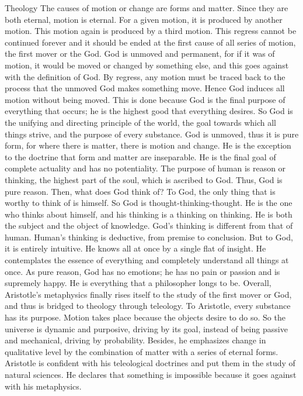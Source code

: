 \documentclass[11pt]{article}
\begin{document}
Theology
  The causes of motion or change are forms and matter. Since they are both eternal, motion is eternal. For a given motion, it is produced by another motion. This motion again is produced by a third motion. This regress cannot be continued forever and it should be ended at the first cause of all series of motion, the first mover or the God. God is unmoved and permanent, for if it was of motion, it would be moved or changed by something else, and this goes against with the definition of God. By regress, any motion must be traced back to the process that the unmoved God makes something move. Hence God induces all motion without being moved. This is done because God is the final purpose of everything that occurs; he is the highest good that everything desires. So God is the unifying and directing principle of the world, the goal towards which all things strive, and the purpose of every substance.
  God is unmoved, thus it is pure form, for where there is matter, there is motion and change. He is the exception to the doctrine that form and matter are inseparable. He is the final goal of complete actuality and has no potentiality.
  The purpose of human is reason or thinking, the highest part of the soul, which is ascribed to God. Thus, God is pure reason. Then, what does God think of? To God, the only thing that is worthy to think of is himself. So God is thought-thinking-thought. He is the one who thinks about himself, and his thinking is a thinking on thinking. He is both the subject and the object of knowledge. God’s thinking is different from that of human. Human’s thinking is deductive, from premise to conclusion. But to God, it is entirely intuitive. He knows all at once by a single flat of insight. He contemplates the essence of everything and completely understand all things at once. As pure reason, God has no emotions; he has no pain or passion and is supremely happy. He is everything that a philosopher longs to be.
  Overall, Aristotle’s metaphysics finally rises itself to the study of the first mover or God, and thus is bridged to theology through teleology. To Aristotle, every substance has its purpose. Motion takes place because the objects desire to do so. So the universe is dynamic and purposive, driving by its goal, instead of being passive and mechanical, driving by probability. Besides, he emphasizes change in qualitative level by the combination of matter with a series of eternal forms. Aristotle is confident with his teleological doctrines and put them in the study of natural sciences. He declares that something is impossible because it goes against with his metaphysics. 
\end{document}

